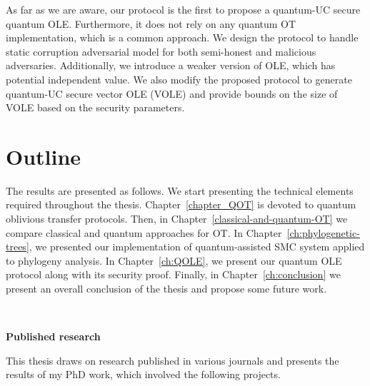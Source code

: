As far as we are aware, our protocol is the first to propose a quantum-UC secure quantum OLE. Furthermore, it does not rely on any quantum OT implementation, which is a common approach. We design the protocol to handle static corruption adversarial model for both semi-honest and malicious adversaries. Additionally, we introduce a weaker version of OLE, which has potential independent value. We also modify the proposed protocol to generate quantum-UC secure vector OLE (VOLE) and provide bounds on the size of VOLE based on the security parameters.

\section*{Outline}

The results are presented as follows. We start presenting the technical elements required throughout the thesis. Chapter~\ref{chapter_QOT} is devoted to quantum oblivious transfer protocols. Then, in Chapter~\ref{classical-and-quantum-OT} we compare classical and quantum approaches for OT. In Chapter~\ref{ch:phylogenetic-trees}, we presented our implementation of quantum-assisted SMC system applied to phylogeny analysis. In Chapter~\ref{ch:QOLE}, we present our quantum OLE protocol along with its security proof. Finally, in Chapter~\ref{ch:conclusion} we present an overall conclusion of the thesis and propose some future work.


\

\noindent\textbf{Published research}

\noindent This thesis draws on research published in various journals and presents the results of my PhD work, which involved the following projects.

